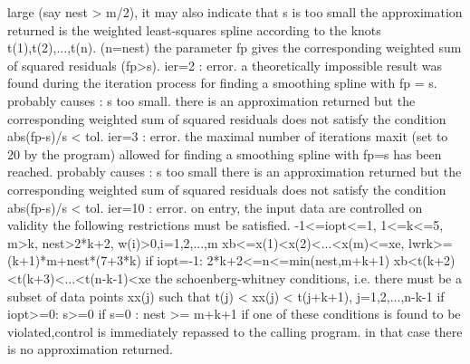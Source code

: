 \documentclass[11pt,twoside,nolof]{starlink}
\begin{document}
\begin{terminalv}
             large (say nest > m/2), it may also indicate that s is
             too small
             the approximation returned is the weighted least-squares
             spline according to the knots t(1),t(2),...,t(n). (n=nest)
             the parameter fp gives the corresponding weighted sum of
             squared residuals (fp>s).
    ier=2  : error. a theoretically impossible result was found during
             the iteration process for finding a smoothing spline with
             fp = s. probably causes : s too small.
             there is an approximation returned but the corresponding
             weighted sum of squared residuals does not satisfy the
             condition abs(fp-s)/s < tol.
    ier=3  : error. the maximal number of iterations maxit (set to 20
             by the program) allowed for finding a smoothing spline
             with fp=s has been reached. probably causes : s too small
             there is an approximation returned but the corresponding
             weighted sum of squared residuals does not satisfy the
             condition abs(fp-s)/s < tol.
    ier=10 : error. on entry, the input data are controlled on validity
             the following restrictions must be satisfied.
             -1<=iopt<=1, 1<=k<=5, m>k, nest>2*k+2, w(i)>0,i=1,2,...,m
             xb<=x(1)<x(2)<...<x(m)<=xe, lwrk>=(k+1)*m+nest*(7+3*k)
             if iopt=-1: 2*k+2<=n<=min(nest,m+k+1)
                         xb<t(k+2)<t(k+3)<...<t(n-k-1)<xe
                       the schoenberg-whitney conditions, i.e. there
                       must be a subset of data points xx(j) such that
                         t(j) < xx(j) < t(j+k+1), j=1,2,...,n-k-1
             if iopt>=0: s>=0
                         if s=0 : nest >= m+k+1
             if one of these conditions is found to be violated,control
             is immediately repassed to the calling program. in that
             case there is no approximation returned.


\end{terminalv}
\end{document}
